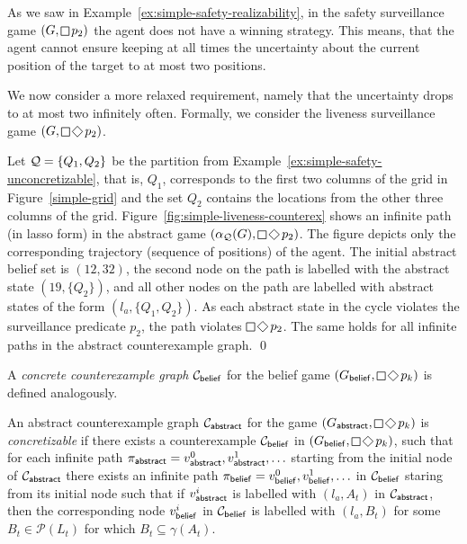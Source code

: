 \begin{example}\label{ex:simple-liveness-counterex}
As we saw in Example~\ref{ex:simple-safety-realizability}, in the safety surveillance game $(G,\LTLglobally p_2)$ the agent does not have a winning strategy. This means, that the agent cannot ensure keeping at all times the uncertainty about the current position of the target to at most two positions.

We now consider a more relaxed requirement, namely that the uncertainty drops to at most two infinitely often. Formally, we consider the liveness surveillance game 
$(G,\LTLglobally \LTLfinally p_2)$.

Let $\mathcal{Q} = \{Q_1,Q_2\}$ be the partition from Example~\ref{ex:simple-safety-unconcretizable},  that is, $Q_1$, corresponds to the first two columns of the grid in Figure~\ref{simple-grid} and the set $Q_2$ contains the locations from the other three columns of the grid. Figure~\ref{fig:simple-liveness-counterex} shows an infinite path (in lasso form) in the abstract game $(\alpha_\part(G),\LTLglobally \LTLfinally p_2)$.  The figure depicts only the corresponding trajectory (sequence of positions) of the agent. The initial abstract belief set is $(12,32)$, the second node on the path is labelled with the abstract state $(19,\{Q_2\})$, and all other nodes on the path are labelled with abstract states of the form $(l_a,\{Q_1,Q_2\})$. As each abstract state in the cycle violates the surveillance predicate $p_2$, the path violates $\LTLglobally \LTLfinally p_2$. The same holds for all infinite paths in the abstract counterexample graph.
\qed
\end{example}

A \emph{concrete counterexample graph} $\mathcal{C}_{\mathsf{belief}}$ for the belief game $(G_\belief,\LTLglobally\LTLfinally p_k)$ is defined analogously. 

An abstract counterexample graph $\mathcal{C}_{\mathsf{abstract}}$ for the game $(G_\abstr,\LTLglobally\LTLfinally p_k)$ is \emph{concretizable} if there exists a counterexample
$\mathcal{C}_{\mathsf{belief}}$ in $(G_\belief,\LTLglobally \LTLfinally p_k)$, such that for each infinite path $\pi_{\mathsf{abstract}} = v_{\mathsf{abstract}}^0,v_{\mathsf{abstract}}^1,\ldots$ starting from the initial node of $\mathcal{C}_{\mathsf{abstract}}$ there exists an infinite path $\pi_{\mathsf{belief}} = v_{\mathsf{belief}}^0,v_{\mathsf{belief}}^1,\ldots$ in $\mathcal{C}_{\mathsf{belief}}$ staring from its initial node such that if $v_{\mathsf{abstract}}^i$ is labelled with $(l_a,A_t)$ in $\mathcal{C}_{\mathsf{abstract}}$, then the corresponding node $v_{\mathsf{belief}}^i$ in $\mathcal{C}_{\mathsf{belief}}$ is labelled with $(l_a,B_t)$ for some $B_t \in \mathcal{P}(L_t)$ for which $B_t \subseteq \gamma(A_t)$.

